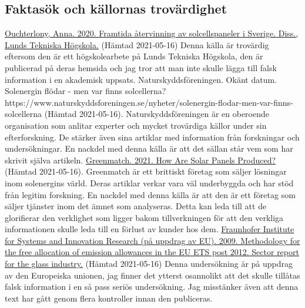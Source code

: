 \documentclass{article}
\begin{document}
\subsection{Faktasök och källornas trovärdighet}

\href{https://lup.lub.lu.se/student-papers/search/publication/9006745}{Ouchterlony, Anna. 2020. Framtida återvinning av solcellspaneler i Sverige. Diss., Lunds Tekniska Högskola.}
(Hämtad 2021-05-16)
Denna källa är trovärdig eftersom den är ett högskolearbete på Lunds Tekniska Högskola, den är publicerad på deras hemsida och jag tror att man inte skulle lägga till falsk information i en akademisk uppsats.
\newline
\newline
Naturskyddsföreningen. Okänt datum. Solenergin flödar - men var finns solcellerna?
https://www.naturskyddsforeningen.se/nyheter/solenergin-flodar-men-var-finns-solcellerna
(Hämtad 2021-05-16).
Naturskyddsföreningen är en oberoende organisation som anlitar experter och mycket trovärdiga källor under sin efterforskning. De stärker även sina artiklar med information från forskningar och undersökningar. En nackdel med denna källa är att det sällan står vem som har skrivit själva artikeln.
\newline
\newline
\href{https://www.greenmatch.co.uk/blog/2014/12/how-are-solar-panels-made}{Greenmatch. 2021. How Are Solar Panels Produced?}
(Hämtad 2021-05-16).
Greenmatch är ett brittiskt företag som säljer lösningar inom solenergins värld. Deras artiklar verkar vara väl underbyggda och har stöd från legitim forskning. En nackdel med denna källa är att den är ett företag som säljer tjänster inom det ämnet som analyseras. Detta kan leda till att de glorifierar den verklighet som ligger bakom tillverkningen för att den verkliga informationen skulle leda till en förlust av kunder hos dem.
\newline
\newline
\href{https://ec.europa.eu/clima/sites/default/files/ets/allowances/docs/bm_study-glass_en.pdf}{Fraunhofer Institute for Systems and Innovation Research (på uppdrag av EU). 2009. Methodology for the free allocation of emission allowances in the EU ETS post 2012. Sector report for the glass industry.}
(Hämtad 2021-05-16)
Denna undersökning är på uppdrag av den Europeiska unionen, jag finner det ytterst osannolikt att det skulle tillåtas falsk information i en så pass seriös undersökning. Jag misstänker även att denna text har gått genom flera kontroller innan den publiceras.
\pagebreak
\end{document}
